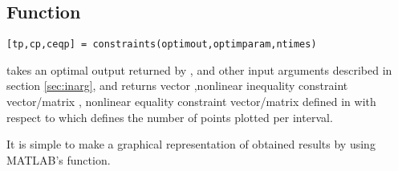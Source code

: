 \subsection{Function~}
\label{sec:constraints}

\begin{verbatim}
[tp,cp,ceqp] = constraints(optimout,optimparam,ntimes)
\end{verbatim}
takes an optimal output  returned by , and
other input arguments  described in section
\ref{sec:inarg}, and returns vector ,nonlinear inequality 
constraint vector/matrix , nonlinear equality constraint
vector/matrix  defined in  with respect to
 which defines the number of points plotted per interval.

It is simple to make a graphical representation of obtained results by
using MATLAB's  function.



